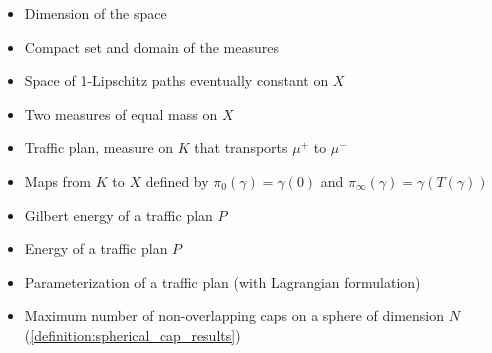 \documentclass[11pt,reqno,a4paper]{amsart}
\newenvironment{itemizeb}
{\begin{itemize}
     \itemsep=2pt}{
\end{itemize}}
\numberwithin{equation}{section}
\theoremstyle{mytheorem}
\theoremstyle{myremark}
\theoremstyle{myparagraph}
\newcommand{\R}{\mathbb{R}}
\begin{document}
    \begin{itemizeb}
         cm=.3 cm
        \item[$N$] Dimension of the space
        \item[$X \subseteq \R^N$] Compact set and domain of the measures
        \item[$K$] Space of 1-Lipschitz paths eventually constant on $X$
        \item[$\mu^+, \mu^-$] Two measures of equal mass on $X$
        \item[$\mathbf{P}$] Traffic plan, measure on $K$ that transports $\mu^+$ to $\mu^-$
        \item[$\pi_0, \pi_\infty$] Maps from $K$ to $X$ defined by $\pi_0(\gamma) = \gamma(0)$ and $\pi_\infty(\gamma) = \gamma(T(\gamma))$
        \item[$\mathcal{E}^{\alpha}(P)$] Gilbert energy of a traffic plan $P$
        \item[$E^{\alpha}(P)$] Energy of a traffic plan $P$
        \item[$\chi$] Parameterization of a traffic plan (with Lagrangian formulation)
        \item[$C(\beta, N)$] Maximum number of non-overlapping caps on a sphere of dimension $N$ (\ref{definition:spherical_cap_results})
    \end{itemizeb}
\end{document}
